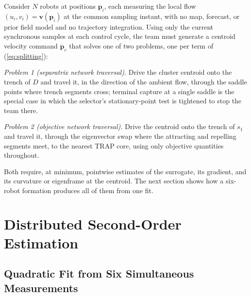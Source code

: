 \documentclass[lettersize,journal]{IEEEtran}
\begin{document}
Consider $N$ robots at positions $\mathbf{p}_i$, each measuring the
local flow $(u_i, v_i) = \mathbf{v}(\mathbf{p}_i)$ at the common
sampling instant, with no map, forecast, or prior field model and no
trajectory integration. Using only the current synchronous samples at
each control cycle, the team must generate a centroid velocity command
$\dot{\mathbf{p}}_c$ that solves one of two problems, one per term of
(\ref{eq:splitting}):

\emph{Problem 1 (separatrix network traversal).} Drive the cluster
centroid onto the trench of $D$ and travel it, in the direction of the
ambient flow, through the saddle points where trench segments cross;
terminal capture at a single saddle is the special case in which the
selector's stationary-point test is tightened to stop the team there.

\emph{Problem 2 (objective network traversal).} Drive the centroid onto
the trench of $s_1$ and travel it, through the eigenvector swap where the
attracting and repelling segments meet, to the nearest TRAP core, using
only objective quantities throughout.

Both require, at minimum, pointwise estimates of the surrogate, its
gradient, and its curvature or eigenframe at the centroid. The next
section shows how a six-robot formation produces all of them from one
fit.

\section{Distributed Second-Order Estimation}
\label{sec:estimation}

\subsection{Quadratic Fit from Six Simultaneous Measurements}
\end{document}
